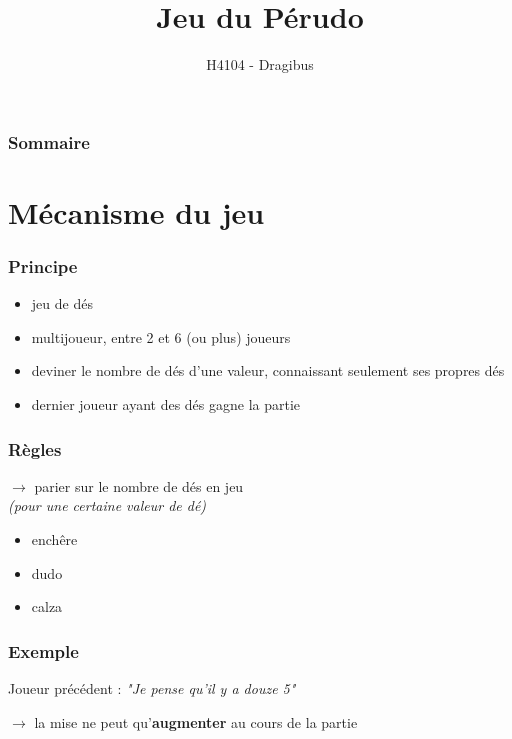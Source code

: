 \documentclass{beamer}
\title{Jeu du Pérudo}
\author{H4104 - Dragibus}
\institute{INSA de Lyon}
\begin{document}
\begin{frame}
  \titlepage
\end{frame}

\begin{frame}
  \frametitle{Sommaire}
  \tableofcontents[hideallsubsections]
\end{frame}

\section{Mécanisme du jeu}

\begin{frame}
  \frametitle{Principe}


  \begin{itemize}
    \item jeu de dés
    \item multijoueur, entre 2 et 6 (ou plus) joueurs
    \item deviner le nombre de dés d'une valeur, connaissant seulement ses
      propres dés
    \item dernier joueur ayant des dés gagne la partie
  \end{itemize}
\end{frame}

\begin{frame}
  \frametitle{Règles}
  $\to$ parier sur le nombre de dés en jeu \\
  \emph{(pour une certaine valeur de dé)}

  \begin{itemize}
    \item enchêre
    \item dudo
    \item calza
  \end{itemize}
\end{frame}

\begin{frame}
  \frametitle{Exemple}


  \begin{center}
    Joueur précédent : \textit{"Je pense qu'il y a douze 5"}
    \\
  \end{center}

  $\to$ la mise ne peut qu'\textbf{augmenter} au cours de la partie
\end{frame}
\end{document}
